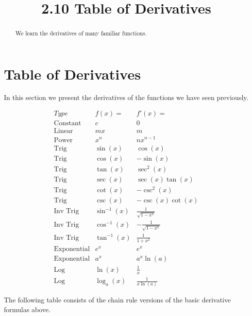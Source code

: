 \documentclass{ximera}
\title{2.10 Table of Derivatives}
\begin{document}
\begin{abstract}
We learn the derivatives of many familiar functions.
\end{abstract}

\maketitle


\section{Table of Derivatives}

In this section we present the derivatives of the functions we have seen previously.  

\begin{center}
\[
\begin{array}{c|c|c}
		Type & f(x)= & f'(x)=  \\
		\hline
		\text{Constant} & c & 0 \\
		\text{Linear} & mx & m  \\
		\text{Power} & x^n & nx^{n-1}  \\
		\hline
		\text{Trig} & \sin(x) & \cos(x) \\
		\text{Trig} & \cos(x) & -\sin(x) \\
		\hline
		\text{Trig} & \tan(x) & \sec^2(x) \\
		\text{Trig} & \sec(x) & \sec(x)\tan(x) \\
		\hline
		\text{Trig} & \cot(x) & -\csc^2(x)\ \\
		\text{Trig} & \csc(x) & -\csc(x)\cot(x) \\
		\hline
		\text{Inv Trig} & \sin^{-1}(x) & \frac{1}{\sqrt{1-x^2}} \\
		\text{Inv Trig} & \cos^{-1}(x) & -\frac{1}{\sqrt{1-x^2}} \\
		\text{Inv Trig} & \tan^{-1}(x) & \frac{1}{1+x^2} \\
		\hline
		\text{Exponential} & e^x & e^x \\
		\text{Exponential} & a^x & a^x\ln(a) \\
		\hline
		\text{Log} & \ln(x) & \frac{1}{x} \\
		\text{Log} & \log_a(x) & \frac{1}{x\ln(a)}
	\end{array}
    \]
\end{center}



The following table consists of the chain rule versions of the basic derivative formulas above.
\end{document}
